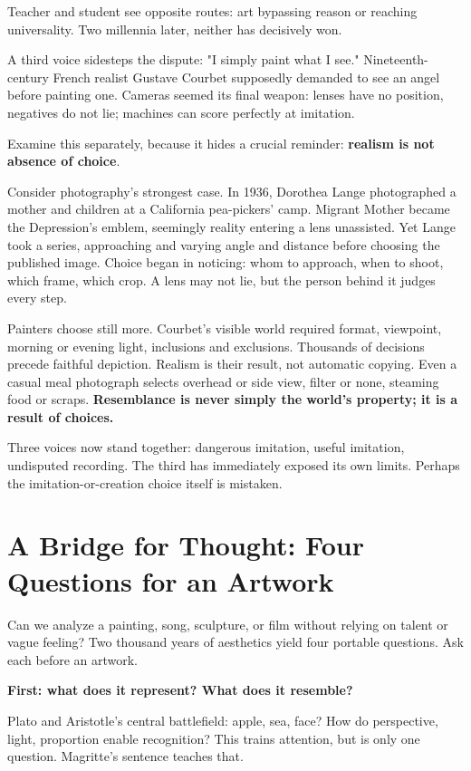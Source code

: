 Teacher and student see opposite routes: art bypassing reason or reaching universality. Two millennia later, neither has decisively won.

A third voice sidesteps the dispute: "I simply paint what I see." Nineteenth-century French realist Gustave Courbet supposedly demanded to see an angel before painting one. Cameras seemed its final weapon: lenses have no position, negatives do not lie; machines can score perfectly at imitation.

Examine this separately, because it hides a crucial reminder: \textbf{realism is not absence of choice}.

Consider photography's strongest case. In 1936, Dorothea Lange photographed a mother and children at a California pea-pickers' camp. Migrant Mother became the Depression's emblem, seemingly reality entering a lens unassisted. Yet Lange took a series, approaching and varying angle and distance before choosing the published image. Choice began in noticing: whom to approach, when to shoot, which frame, which crop. A lens may not lie, but the person behind it judges every step.

Painters choose still more. Courbet's visible world required format, viewpoint, morning or evening light, inclusions and exclusions. Thousands of decisions precede faithful depiction. Realism is their result, not automatic copying. Even a casual meal photograph selects overhead or side view, filter or none, steaming food or scraps. \textbf{Resemblance is never simply the world's property; it is a result of choices.}

Three voices now stand together: dangerous imitation, useful imitation, undisputed recording. The third has immediately exposed its own limits. Perhaps the imitation-or-creation choice itself is mistaken.

\section[Four Questions for an Artwork]{A Bridge for Thought: Four Questions for an Artwork}
Can we analyze a painting, song, sculpture, or film without relying on talent or vague feeling? Two thousand years of aesthetics yield four portable questions. Ask each before an artwork.

\textbf{First: what does it represent? What does it resemble?}

Plato and Aristotle's central battlefield: apple, sea, face? How do perspective, light, proportion enable recognition? This trains attention, but is only one question. Magritte's sentence teaches that.

